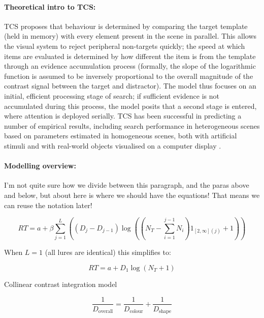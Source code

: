 \documentclass[smallextended]{svjour3}       %
\begin{document}
\paragraph{Theoretical intro to TCS:}
TCS proposes that behaviour is determined by comparing the target template (held in memory) with every element present in the scene in parallel. This allows the visual system to reject peripheral non-targets quickly; the speed at which items are evaluated is determined by how different the item is from the template through an evidence accumulation process (formally, the slope of the logarithmic function is assumed to be inversely proportional to the overall magnitude of the contrast signal between the target and distractor). The model thus focuses on an initial, efficient processing stage of search; if sufficient evidence is not accumulated during this process, the model posits that a second stage is entered, where attention is deployed serially. TCS has been successful in predicting a number of empirical results, including search performance in heterogeneous scenes based on parameters estimated in homogeneous scenes, both with artificial stimuli \cite{buetti2016towards,lleras2019predicting} and with real-world objects visualised on a computer display \cite{wang2017predicting}. 

\paragraph{Modelling overview:} I'm not quite sure how we divide between this paragraph, and the paras above and below, but about here is where we should have the equations! That means we can reuse the notation later!

\begin{equation}
RT = a + \beta\sum_{j=1}^L\left((D_j - D_{j-1})\log\left(\left(N_T - \sum_{i=1}^{j-1}N_i\right)1_{[2,\infty](j)}+1 \right)\right)
\label{eq:buetti2019}
\end{equation}

When $L=1$ (all lures are identical) this simplifies to:

\begin{equation}
RT = a + D_1\log(N_T+1)
\end{equation}

Collinear contrast integration model

\begin{equation}
\frac{1}{D_\text{overall}} = \frac{1}{D_\text{colour}} + \frac{1}{D_\text{shape}}
\label{eq:collinearcontrast}
\end{equation}
\end{document}
